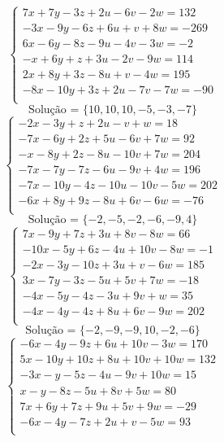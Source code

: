 \documentclass[12pt,oneside,a4paper]{article}
\begin{document}
\vspace{\baselineskip}
\begin{equation*}
\begin{cases}
7x+7y-3z+2u-6v-2w=132 \\
-3x-9y-6z+6u+v+8w=-269 \\
6x-6y-8z-9u-4v-3w=-2 \\
-x+6y+z+3u-2v-9w=114 \\
2x+8y+3z-8u+v-4w=195 \\
-8x-10y+3z+2u-7v-7w=-90 \\
\end{cases}
\end{equation*}
\begin{equation*}
\text{Solução = }\{10,10,10,-5,-3,-7\}
\end{equation*}
\vspace{\baselineskip}
\begin{equation*}
\begin{cases}
-2x-3y+z+2u-v+w=18 \\
-7x-6y+2z+5u-6v+7w=92 \\
-x-8y+2z-8u-10v+7w=204 \\
-7x-7y-7z-6u-9v+4w=196 \\
-7x-10y-4z-10u-10v-5w=202 \\
-6x+8y+9z-8u+6v-6w=-76 \\
\end{cases}
\end{equation*}
\begin{equation*}
\text{Solução = }\{-2,-5,-2,-6,-9,4\}
\end{equation*}
\vspace{\baselineskip}
\begin{equation*}
\begin{cases}
7x-9y+7z+3u+8v-8w=66 \\
-10x-5y+6z-4u+10v-8w=-1 \\
-2x-3y-10z+3u+v-6w=185 \\
3x-7y-3z-5u+5v+7w=-18 \\
-4x-5y-4z-3u+9v+w=35 \\
-4x-4y-4z+8u+6v-9w=202 \\
\end{cases}
\end{equation*}
\begin{equation*}
\text{Solução = }\{-2,-9,-9,10,-2,-6\}
\end{equation*}
\vspace{\baselineskip}
\begin{equation*}
\begin{cases}
-6x-4y-9z+6u+10v-3w=170 \\
5x-10y+10z+8u+10v+10w=132 \\
-3x-y-5z-4u-9v+10w=15 \\
x-y-8z-5u+8v+5w=80 \\
7x+6y+7z+9u+5v+9w=-29 \\
-6x-4y-7z+2u+v-5w=93 \\
\end{cases}
\end{equation*}
\end{document}
